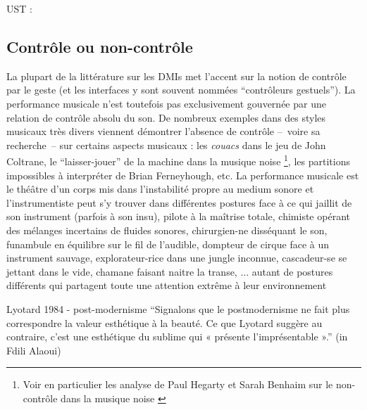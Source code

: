\cite{cadoz_instrumental_1988}

\cite{delalande_geste_1988}

UST : \cite{delalande_les_1996}


\subsection{Contrôle ou non-contrôle}

\noindent La plupart de la littérature sur les \glspl{DMI} met l'accent sur la notion de contrôle par le geste (et les interfaces y sont souvent nommées ``contrôleurs gestuels''). La performance musicale n'est toutefois pas exclusivement gouvernée par une relation de contrôle absolu du son. De nombreux exemples dans des styles musicaux très divers viennent démontrer l'absence de contrôle --~voire sa recherche~-- sur certains aspects musicaux : les \textit{couacs} dans le jeu de John Coltrane, le ``laisser-jouer'' de la machine dans la musique noise \footnote{Voir en particulier les analyse de Paul Hegarty et Sarah Benhaim sur le non-contrôle dans la musique noise \cite{hegarty_noise_2007, benhaim_aux_2018}}, les partitions impossibles à interpréter de Brian Ferneyhough, etc. La performance musicale est le théâtre d'un corps mis dans l'instabilité propre au medium sonore et l'instrumentiste peut s'y trouver dans différentes postures face à ce qui jaillit de son instrument (parfois à son insu), pilote à la maîtrise totale, chimiste opérant des mélanges incertains de fluides sonores, chirurgien-ne disséquant le son, funambule en équilibre sur le fil de l'audible, dompteur de cirque face à un instrument sauvage, explorateur-rice dans une jungle inconnue, cascadeur-se se jettant dans le vide, chamane faisant naitre la transe, ... autant de postures différents qui partagent toute une attention extrême à leur environnement


Lyotard 1984 - post-modernisme ``Signalons que le postmodernisme ne fait plus correspondre la valeur esthétique à la beauté. Ce que Lyotard suggère au contraire, c’est une esthétique du sublime qui « présente l’imprésentable ».'' (in Fdili Alaoui)



